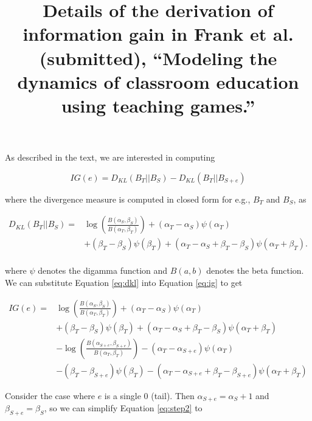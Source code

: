 \documentclass[12pt]{article}
\title{Details of the derivation of information gain in Frank et al. (submitted), ``Modeling the dynamics of classroom education using teaching games.''}
\date{}
\begin{document}
\maketitle

As described in the text, we are interested in computing

\begin{equation}
\label{eq:ig}
IG(e) = D_{KL} ( B_T || B_{S} )  - D_{KL} (B_T ||B_{S+e} ) 
\end{equation}

\noindent where the divergence measure is computed in closed form for e.g., $B_T$ and $B_S$, as

\begin{equation}
\label{eq:dkl}
\begin{split}
D_{KL} (B_T ||B_{S} )  = & \log( \frac{B(\alpha_{S},\beta_{S})}{B(\alpha_{T},\beta_{T})}) +  (\alpha_T - \alpha_S) \psi (\alpha_T) \\ 
& + (\beta_T - \beta_S) \psi (\beta_T) +  (\alpha_T - \alpha_S + \beta_T - \beta_S) \psi (\alpha_T + \beta_T). \\
\end{split}
\end{equation}

\noindent where $\psi$ denotes the digamma function and $B(a,b)$ denotes the beta function. We can substitute Equation \ref{eq:dkl} into Equation \ref{eq:ig} to get

\begin{equation}
\begin{split}
IG(e)  = & \log( \frac{B(\alpha_{S},\beta_{S})}{B(\alpha_{T},\beta_{T})}) + (\alpha_T - \alpha_S) \psi (\alpha_T)  \\ 
& + (\beta_T - \beta_S) \psi (\beta_T) +  (\alpha_T - \alpha_S + \beta_T - \beta_S) \psi (\alpha_T + \beta_T)  \\
& - \log( \frac{B(\alpha_{S+e},\beta_{S+e})}{B(\alpha_{T},\beta_{T})}) - (\alpha_T - \alpha_{S+e}) \psi (\alpha_T) \\ 
& - (\beta_T - \beta_{S+e}) \psi (\beta_T) - (\alpha_T - \alpha_{S+e} + \beta_T - \beta_{S+e}) \psi (\alpha_T + \beta_T)
\end{split}
\label{eq:step2}
\end{equation}

Consider the case where $e$ is a single 0 (tail). Then $\alpha_{S+e}= \alpha_S + 1$ and $\beta_{S+e}= \beta_{S}$, so we can simplify Equation \ref{eq:step2} to
\end{document}
